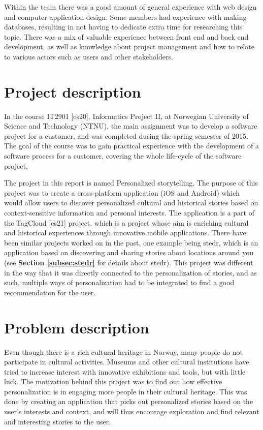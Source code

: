 Within the team there was a good amount of general experience with web design and computer application design. Some members had experience with making databases, resulting in not having to dedicate extra time for researching this topic. There was a mix of valuable experience between front end and back end development, as well as knowledge about project management and how to relate to various actors such as users and other stakeholders.

\section{Project description}

In the course IT2901 [es20], Informatics Project II, at Norwegian University of Science and Technology (NTNU), the main assignment was to develop a software project for a customer, and was completed during the spring semester of 2015. The goal of the course was to gain practical experience with the development of a software process for a customer, covering the whole life-cycle of the software project.

The project in this report is named Personalized storytelling. The purpose of this project was to create a cross-platform application (iOS and Android) which would allow users to discover personalized cultural and historical stories based on context-sensitive information and personal interests. The application is a part of the TagCloud [es21] project, which is a project whose aim is enriching cultural and historical experiences through innovative mobile applications.
There have been similar projects worked on in the past, one example being stedr, which is an application based on discovering and sharing stories about  locations around you (see \textbf{Section \ref{subsec:stedr}} for details about stedr). This project was different in the way that it was directly connected to the personalization of stories, and as such, multiple ways of personalization had to be integrated to find a good recommendation for the user.

\section{Problem description}

Even though there is a rich cultural heritage in Norway, many people do not participate in cultural activities. Museums and other cultural institutions have tried to increase interest with innovative exhibitions and tools, but with little luck. The motivation behind this project was to find out how effective personalization is in engaging more people in their cultural heritage. This was done by creating an application that picks out personalized stories based on the user's interests and context, and will thus encourage exploration and find relevant and interesting stories to the user. 

